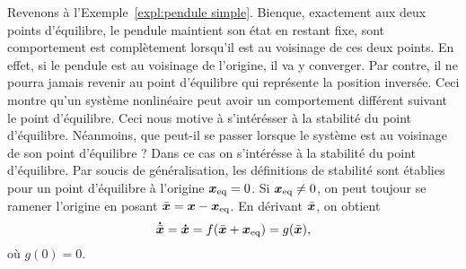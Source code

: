 Revenons à l'Exemple~\ref{expl:pendule simple}. Bienque, exactement aux deux points d'équilibre, le pendule maintient son état en restant fixe, sont comportement est complètement lorsqu'il est au voisinage de ces deux points. En effet, si le pendule est au voisinage de l'origine, il va y converger. Par contre, il ne pourra jamais revenir au point d'équilibre qui représente la position inversée. Ceci montre qu'un système nonlinéaire peut avoir un comportement différent suivant le point d'équilibre. Ceci nous motive à s'intérésser à la stabilité du point d'équilibre. Néanmoins, que peut-il se passer lorsque le système est au voisinage de son point d'équilibre ? Dans ce cas on s'intérésse à la stabilité du point d'équilibre. Par soucis de généralisation, les définitions de stabilité sont établies pour un point d'équilibre à l'origine $\bm{x}_{\rm eq}=0$.  Si $\bm{x}_{\rm eq}\neq0$, on peut toujour se ramener l'origine en  posant $\bar{\bm{x}} = \bm{x} - \bm{x}_{\rm eq}$. En dérivant $\bar{\bm{x}}$, on obtient
\begin{equation}
	\bm\dot{\bar{\bm{x}}} = \bm{\dot{x}} = f(\bar{\bm{x}}+\bm{x}_{\rm eq}) =g(\bar{\bm{x}}),  
\end{equation} 
où $g(0)=0$.
